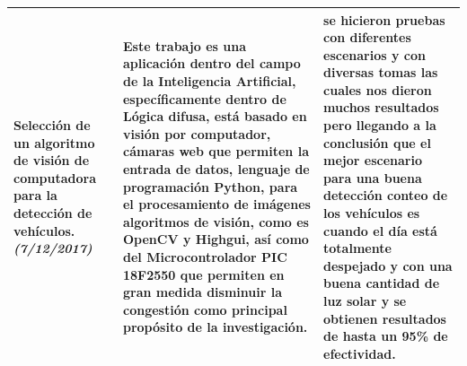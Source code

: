\begin{center}
\begin{longtable}{|p{2.7cm}|p{7cm}|p{5.0cm}|}
		Selección de un algoritmo de visión de computadora para la detección de vehículos. \cite{ittap} \newline \emph{(7/12/2017)}&
		Este trabajo es una aplicación dentro del campo de la Inteligencia Artificial, específicamente dentro de Lógica difusa, está basado en visión por computador, cámaras web que permiten la entrada de datos, lenguaje de programación Python, para el procesamiento de imágenes algoritmos de visión, como es OpenCV y Highgui, así como del Microcontrolador PIC 18F2550 que permiten en gran medida disminuir la congestión como principal propósito de la investigación.&
		se hicieron pruebas con diferentes escenarios y con diversas tomas las cuales nos dieron muchos resultados pero llegando a la conclusión que el mejor escenario para una buena detección conteo de los vehículos es cuando el día está totalmente despejado y con una buena cantidad de luz solar y se obtienen resultados de hasta un 95\% de efectividad. \\ \hline
		
		
	\end{longtable}
	
\end{center}


